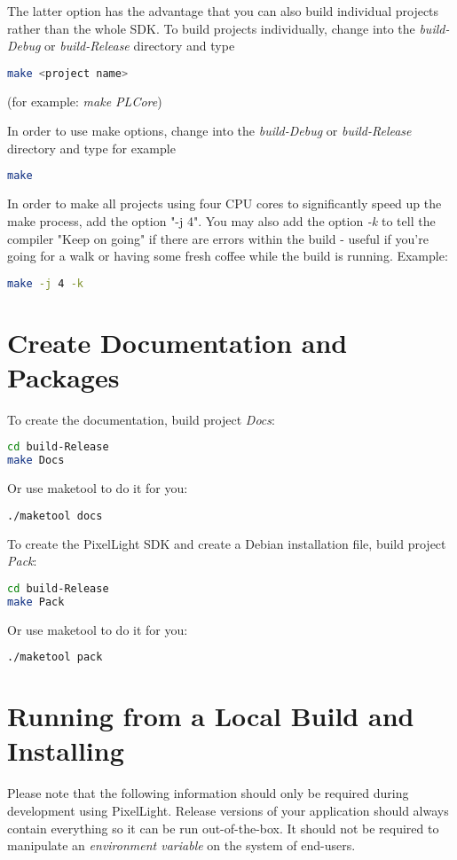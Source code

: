 The latter option has the advantage that you can also build individual projects rather than the whole \ac{SDK}. To build projects individually, change into the \emph{build-Debug} or \emph{build-Release} directory and type
\begin{lstlisting}[language=sh]
make <project name>
\end{lstlisting}
(for example: \emph{make PLCore})

In order to use make options, change into the \emph{build-Debug} or \emph{build-Release} directory and type for example
\begin{lstlisting}[language=sh]
make
\end{lstlisting}
In order to make all projects using four \ac{CPU} cores to significantly speed up the make process, add the option "-j 4". You may also add the option \emph{-k} to tell the compiler "Keep on going" if there are errors within the build - useful if you're going for a walk or having some fresh coffee while the build is running. Example:
\begin{lstlisting}[language=sh]
make -j 4 -k
\end{lstlisting}




\section{Create Documentation and Packages}
To create the documentation, build project \emph{Docs}:
\begin{lstlisting}[language=sh]
cd build-Release
make Docs
\end{lstlisting}

Or use maketool to do it for you:
\begin{lstlisting}[language=sh]
./maketool docs
\end{lstlisting}

To create the PixelLight \ac{SDK} and create a Debian installation file, build project \emph{Pack}:
\begin{lstlisting}[language=sh]
cd build-Release
make Pack
\end{lstlisting}

Or use maketool to do it for you:
\begin{lstlisting}[language=sh]
./maketool pack
\end{lstlisting}




\section{Running from a Local Build and Installing}
\label{Chapter:Linux_RunningFromALocalBuildAndInstalling}
Please note that the following information should only be required during development using PixelLight. Release versions of your application should always contain everything so it can be run out-of-the-box. It should not be required to manipulate an \emph{environment variable} on the system of end-users.

